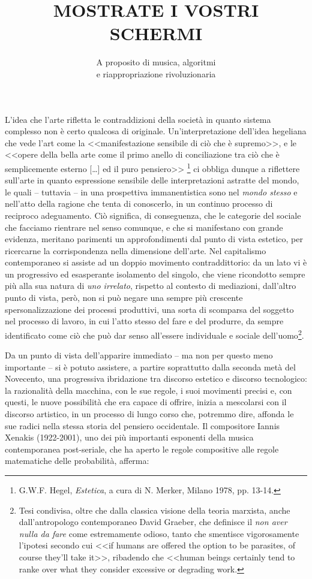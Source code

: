 \documentclass[a4paper,12pt]{scrartcl}
\title{\LARGE{MOSTRATE I VOSTRI SCHERMI}}
\author{}
\subtitle{A proposito di musica, algoritmi \\ e riappropriazione rivoluzionaria\footref{altraparola}}
\date{}
\newcommand{\omissis}{[\dots\unkern]}
\begin{document}
	
	\maketitle
	
	
	
	L'idea che l'arte rifletta le contraddizioni della società in quanto sistema complesso non è certo qualcosa di originale. Un'interpretazione dell'idea hegeliana che vede l'art come la <<manifestazione sensibile di ciò che è supremo>>, e le <<opere della bella arte come il primo anello di conciliazione tra ciò che è semplicemente esterno \omissis{} ed il puro pensiero>> 
	\footnote{G.W.F. Hegel, \emph{Estetica}, a cura di N. Merker, Milano 1978, pp. 13-14.} ci obbliga dunque a riflettere sull'arte in quanto espressione sensibile delle interpretazioni astratte del mondo, le quali -- tuttavia -- in una prospettiva immanentistica sono nel \emph{mondo stesso} e nell'atto della ragione che tenta di conoscerlo, in un continuo processo di reciproco adeguamento. Ciò significa, di conseguenza, che le categorie del sociale che facciamo rientrare nel senso comunque, e che si manifestano con grande evidenza, meritano parimenti un approfondimenti dal punto di vista estetico, per ricercarne la corrispondenza nella dimensione dell'arte. Nel capitalismo contemporaneo si assiste ad un doppio movimento contraddittorio: da un lato vi è un progressivo ed esasperante isolamento del singolo, che viene ricondotto sempre più alla sua natura di \emph{uno irrelato}, rispetto al contesto di mediazioni, dall'altro punto di vista, però, non si può negare una sempre più crescente spersonalizzazione dei processi produttivi, una sorta di scomparsa del soggetto nel processo di lavoro, in cui l'atto stesso del fare e del produrre, da sempre identificato come ciò che può dar senso all'essere individuale e sociale dell'uomo\footnote{Tesi condivisa, oltre che dalla classica visione della teoria marxista, anche dall'antropologo contemporaneo David Graeber, che definisce il \emph{non aver nulla da fare} come estremamente odioso, tanto che smentisce vigorosamente l'ipotesi secondo cui <<if humans are offered the option to be parasites, of course they'll take it>>, ribadendo che <<human beings certainly tend to ranke over what they consider excessive or degrading work.}.
	
	Da un punto di vista dell’apparire immediato – ma non per questo meno importante – si è potuto assistere, a partire soprattutto dalla seconda metà del Novecento, una progressiva ibridazione tra discorso estetico e discorso tecnologico: la razionalità della macchina, con le sue regole, i suoi movimenti precisi e, con questi, le nuove possibilità che era capace di offrire, inizia a mescolarsi con il discorso artistico, in un processo di lungo corso che, potremmo dire, affonda le sue radici nella stessa storia del pensiero occidentale. Il compositore Iannis Xenakis (1922-2001), uno dei più importanti esponenti della musica contemporanea post-seriale, che ha aperto le regole compositive alle regole matematiche delle probabilità, afferma:
	
\end{document}
